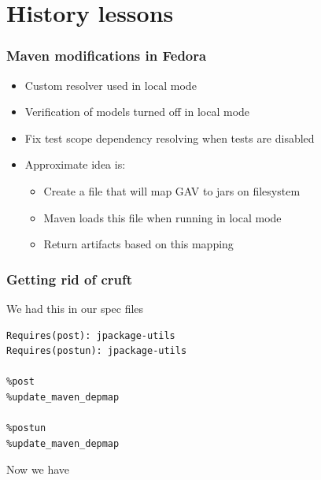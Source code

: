 \documentclass[pdftex,unicode,xcolor=table]{beamer}
\begin{document}
\section{History lessons}
\begin{frame}
\frametitle{Maven modifications in Fedora}
\begin{itemize}
\item Custom resolver used in local mode
\item Verification of models turned off in local mode
\item Fix test scope dependency resolving when tests are disabled
\item Approximate idea is:
  \begin{itemize}
  \item Create a file that will map GAV to jars on filesystem
  \item Maven loads this file when running in local mode
  \item Return artifacts based on this mapping
  \end{itemize}
\end{itemize}
\end{frame}

\begin{frame}[fragile]
  \frametitle{Getting rid of cruft}
  \scriptsize
  \begin{block}{We had this in our spec files}
  \begin{verbatim}
Requires(post): jpackage-utils
Requires(postun): jpackage-utils

%post
%update_maven_depmap

%postun
%update_maven_depmap
\end{verbatim}
\end{block}
\begin{block}{Now we have}
\end{block}
\end{frame}
\end{document}
